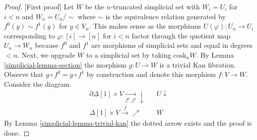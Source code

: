 \begin{proof}
[First proof]
Let $W$ be the $n$-truncated simplicial set with $W_i = U_i$ for
$i < n$ and $W_n = U_n / \sim$ where $\sim$ is the equivalence relation
generated by $f^0(y) \sim f^1(y)$ for $y \in V_n$. This makes sense
as the morphisms $U(\varphi) : U_n \to U_i$ corresponding to
$\varphi : [i] \to [n]$ for $i < n$ factor through the quotient map
$U_n \to W_n$ because $f^0$ and $f^1$ are morphisms of simplicial sets and
equal in degrees $< n$. Next, we upgrade $W$ to a simplicial set
by taking $\text{cosk}_n W$. By Lemma \ref{simplicial-lemma-section}
the morphism $g : U \to W$ is a trivial Kan fibration. Observe
that $g \circ f^0 = g \circ f^1$ by construction and denote
this morphism $f : V \to W$. Consider the diagram
$$
\begin{array}{ccc}\partial \Delta[1] \times V \underset{f^0, f^1}{\longrightarrow}\downarrow &  & U \downarrow \\ \Delta[1] \times V \overset{f}{\longrightarrow}\nearrow &  & W\end{array}
$$
By Lemma \ref{simplicial-lemma-trivial-kan} the dotted arrow exists and the proof is done.
\end{proof}

